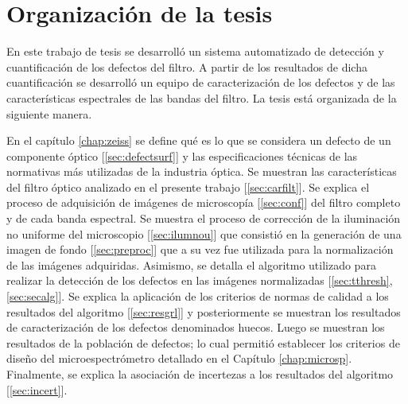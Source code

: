 \singlespacing
\section{Organización de la tesis}

\hspace{0.5cm}En este trabajo de tesis se desarrolló un sistema automatizado de detección y cuantificación de los defectos del filtro. A partir de los resultados de dicha cuantificación se desarrolló un equipo de caracterización de los defectos y de las características espectrales de las bandas del filtro. La tesis está organizada de la siguiente manera.

En el capítulo \ref{chap:zeiss} se define qué es lo que se considera un defecto de un componente óptico [\ref{sec:defectsurf}] y las especificaciones técnicas de las normativas más utilizadas de la industria óptica. Se muestran las características del filtro óptico analizado en el presente trabajo [\ref{sec:carfilt}]. Se explica el proceso de adquisición de imágenes de microscopía [\ref{sec:conf}] del filtro completo y de cada banda espectral. Se muestra el proceso de corrección de la iluminación no uniforme del microscopio [\ref{sec:ilumnou}]  que consistió en la generación de una imagen de fondo [\ref{sec:preproc}] que a su vez fue utilizada para la normalización de las imágenes adquiridas. Asimismo, se detalla el algoritmo utilizado para realizar la detección de los defectos en las imágenes normalizadas [\ref{sec:tthresh},\ref{sec:secalg}]. Se explica la aplicación de los criterios de normas de calidad a los resultados del algoritmo [\ref{sec:resgrl}] y posteriormente se muestran los resultados de caracterización de los defectos denominados huecos. Luego se muestran los resultados de la población de defectos; lo cual permitió establecer los criterios de diseño del microespectrómetro detallado en el Capítulo \ref{chap:microsp}. Finalmente, se explica la asociación de incertezas a los resultados del algoritmo [\ref{sec:incert}].

